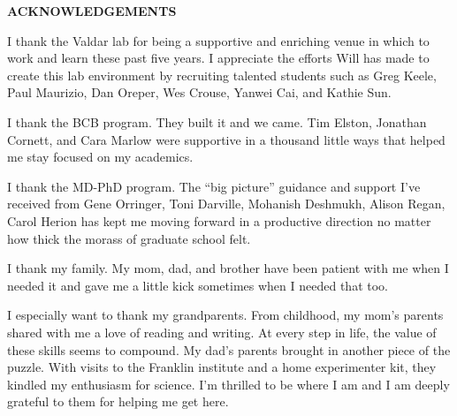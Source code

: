 
\begin{center}
\vspace*{52pt}
{\large \textbf{ACKNOWLEDGEMENTS}}
\end{center}

I thank the Valdar lab for being a supportive and enriching venue in which to work and learn these past five years.
I appreciate the efforts Will has made to create this lab environment by recruiting talented students such as Greg Keele, Paul Maurizio, Dan Oreper, Wes Crouse, Yanwei Cai, and Kathie Sun.


I thank the BCB program.
They built it and we came.
Tim Elston, Jonathan Cornett, and Cara Marlow were supportive in a thousand little ways that helped me stay focused on my academics.

I thank the MD-PhD program.
The ``big picture'' guidance and support I've received from Gene Orringer, Toni Darville, Mohanish Deshmukh, Alison Regan, Carol Herion has kept me moving forward in a productive direction no matter how thick the morass of graduate school felt.

I thank my family.
My mom, dad, and brother have been patient with me when I needed it and gave me a little kick sometimes when I needed that too.

I especially want to thank my grandparents.
From childhood, my mom's parents shared with me a love of reading and writing.
At every step in life, the value of these skills seems to compound.
My dad's parents brought in another piece of the puzzle.
With visits to the Franklin institute and a home experimenter kit, they kindled my enthusiasm for science.
I'm thrilled to be where I am and I am deeply grateful to them for helping me get here.

\clearpage
